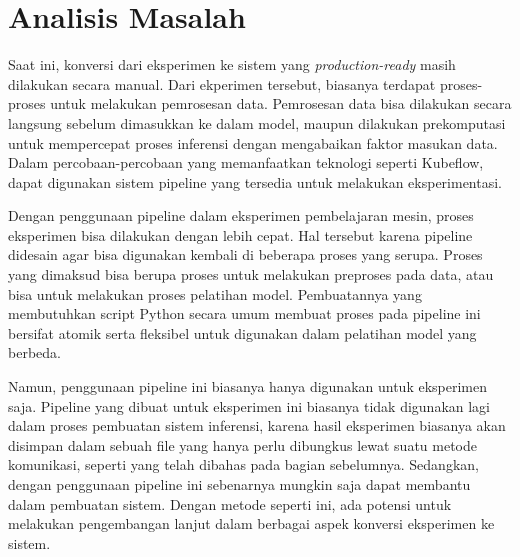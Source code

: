 \section{Analisis Masalah}

Saat ini, konversi dari eksperimen ke sistem yang \textit{production-ready} masih dilakukan secara manual.
Dari ekperimen tersebut, biasanya terdapat proses-proses untuk melakukan pemrosesan data.
Pemrosesan data bisa dilakukan secara langsung sebelum dimasukkan ke dalam model, maupun dilakukan prekomputasi untuk mempercepat proses inferensi dengan mengabaikan faktor masukan data.
Dalam percobaan-percobaan yang memanfaatkan teknologi seperti Kubeflow, dapat digunakan sistem pipeline yang tersedia untuk melakukan eksperimentasi.

Dengan penggunaan pipeline dalam eksperimen pembelajaran mesin, proses eksperimen bisa dilakukan dengan lebih cepat.
Hal tersebut karena pipeline didesain agar bisa digunakan kembali di beberapa proses yang serupa.
Proses yang dimaksud bisa berupa proses untuk melakukan preproses pada data, atau bisa untuk melakukan proses pelatihan model.
Pembuatannya yang membutuhkan script Python secara umum membuat proses pada pipeline ini bersifat atomik serta fleksibel untuk digunakan dalam pelatihan model yang berbeda.

Namun, penggunaan pipeline ini biasanya hanya digunakan untuk eksperimen saja.
Pipeline yang dibuat untuk eksperimen ini biasanya tidak digunakan lagi dalam proses pembuatan sistem inferensi, karena hasil eksperimen biasanya akan disimpan dalam sebuah file yang hanya perlu dibungkus lewat suatu metode komunikasi, seperti yang telah dibahas pada bagian sebelumnya.
Sedangkan, dengan penggunaan pipeline ini sebenarnya mungkin saja dapat membantu dalam pembuatan sistem.
Dengan metode seperti ini, ada potensi untuk melakukan pengembangan lanjut dalam berbagai aspek konversi eksperimen ke sistem.
